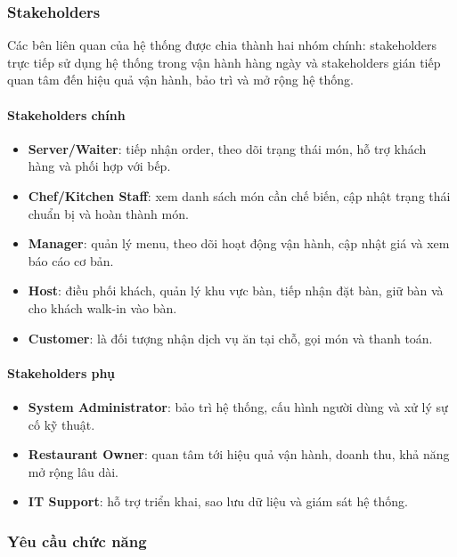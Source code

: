\documentclass[12pt,a4paper]{article}
\begin{document}
\subsubsection{Stakeholders}

Các bên liên quan của hệ thống được chia thành hai nhóm chính: stakeholders trực tiếp sử dụng hệ thống trong vận hành hàng ngày và stakeholders gián tiếp quan tâm đến hiệu quả vận hành, bảo trì và mở rộng hệ thống.

\paragraph{Stakeholders chính}
\begin{itemize}
    \item \textbf{Server/Waiter}: tiếp nhận order, theo dõi trạng thái món, hỗ trợ khách hàng và phối hợp với bếp.
    \item \textbf{Chef/Kitchen Staff}: xem danh sách món cần chế biến, cập nhật trạng thái chuẩn bị và hoàn thành món.
    \item \textbf{Manager}: quản lý menu, theo dõi hoạt động vận hành, cập nhật giá và xem báo cáo cơ bản.
    \item \textbf{Host}: điều phối khách, quản lý khu vực bàn, tiếp nhận đặt bàn, giữ bàn và cho khách walk-in vào bàn.
    \item \textbf{Customer}: là đối tượng nhận dịch vụ ăn tại chỗ, gọi món và thanh toán.
\end{itemize}

\paragraph{Stakeholders phụ}
\begin{itemize}
    \item \textbf{System Administrator}: bảo trì hệ thống, cấu hình người dùng và xử lý sự cố kỹ thuật.
    \item \textbf{Restaurant Owner}: quan tâm tới hiệu quả vận hành, doanh thu, khả năng mở rộng lâu dài.
    \item \textbf{IT Support}: hỗ trợ triển khai, sao lưu dữ liệu và giám sát hệ thống.
\end{itemize}

\subsubsection{Yêu cầu chức năng}
\end{document}
